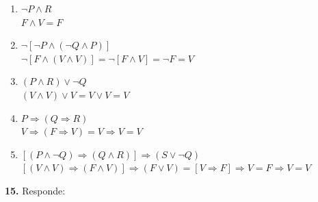 \documentclass[12pt]{article}
\begin{document}
\begin{enumerate}[label=\alph*)]
    \item $\neg P \land R$\\
    $F \land V = F$

    \item $\neg [\neg P \land (\neg Q \land P)]$\\
    $\neg[F \land (V \land V)] = \neg[F \land V] = \neg F = V$

    \item $(P \land R) \lor \neg Q$\\
    $(V \land V) \lor V = V \lor V = V$

    \item $P \Longrightarrow (Q \Longrightarrow R)$\\
    $V \Longrightarrow (F \Longrightarrow V) = V \Longrightarrow V = V$

    \item $[(P \land \neg Q) \Longrightarrow (Q \land R)] \Longrightarrow (S \lor \neg Q)$\\
    $[(V \land V) \Longrightarrow (F \land V)] \Longrightarrow (F \lor V) = [V \Longrightarrow F] \Longrightarrow V = F \Longrightarrow V = V$
\end{enumerate}

%
%
\textbf{15.} Responde:
\end{document}

